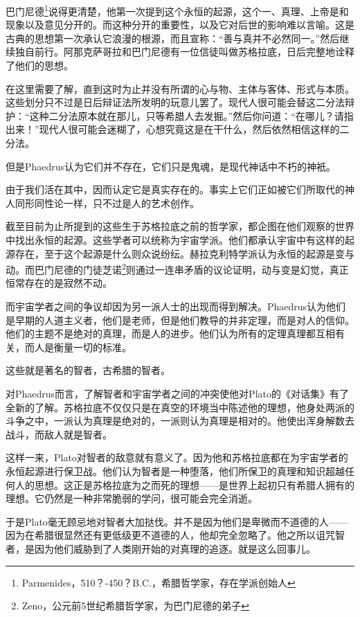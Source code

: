 \documentclass[UTF8]{article}
\begin{document}
\par 巴门尼德\footnote{Parmenides，510？-450？B.C.，希腊哲学家，存在学派创始人}说得更清楚，他第一次提到这个永恒的起源，这个一、真理、上帝是和现象以及意见分开的。而这种分开的重要性，以及它对后世的影响难以言喻。这是古典的思想第一次承认它浪漫的根源，而且宣称：“善与真并不必然同一。”然后继续独自前行。阿那克萨哥拉和巴门尼德有一位信徒叫做苏格拉底，日后完整地诠释了他们的思想。
\par 在这里需要了解，直到这时为止并没有所谓的心与物、主体与客体、形式与本质。这些划分只不过是日后辩证法所发明的玩意儿罢了。现代人很可能会替这二分法辩护：“这种二分法原本就在那儿，只等希腊人去发掘。”然后你问道：“在哪儿？请指出来！”现代人很可能会迷糊了，心想究竟这是在干什么，然后依然相信这样的二分法。
\par 但是Phaedrus认为它们并不存在，它们只是鬼魂，是现代神话中不朽的神衹。
\par 由于我们活在其中，因而认定它是真实存在的。事实上它们正如被它们所取代的神人同形同性论一样，只不过是人的艺术创作。
\par 截至目前为止所提到的这些生于苏格拉底之前的哲学家，都企图在他们观察的世界中找出永恒的起源。这些学者可以统称为宇宙学派。他们都承认宇宙中有这样的起源存在，至于这个起源是什么则众说纷纭。赫拉克利特学派认为永恒的起源是变与动。而巴门尼德的门徒芝诺\footnote{Zeno，公元前5世纪希腊哲学家，为巴门尼德的弟子}则通过一连串矛盾的议论证明，动与变是幻觉，真正恒常存在的是寂然不动。
\par 而宇宙学者之间的争议却因为另一派人士的出现而得到解决。Phaedrus认为他们是早期的人道主义者，他们是老师，但是他们教导的并非定理，而是对人的信仰。他们的主题不是绝对的真理，而是人的进步。他们认为所有的定理真理都互相有关，而人是衡量一切的标准。
\par 这些就是著名的智者，古希腊的智者。
\par 对Phaedrus而言，了解智者和宇宙学者之间的冲突使他对Plato的《对话集》有了全新的了解。苏格拉底不仅仅只是在真空的环境当中陈述他的理想，他身处两派的斗争之中，一派认为真理是绝对的，一派则认为真理是相对的。他使出浑身解数去战斗，而敌人就是智者。
\par 这样一来，Plato对智者的敌意就有意义了。因为他和苏格拉底都在为宇宙学者的永恒起源进行保卫战。他们认为智者是一种堕落，他们所保卫的真理和知识超越任何人的思想。这正是苏格拉底为之而死的理想——是世界上起初只有希腊人拥有的理想。它仍然是一种非常脆弱的学问，很可能会完全消逝。
\par 于是Plato毫无顾忌地对智者大加挞伐。并不是因为他们是卑微而不道德的人——因为在希腊很显然还有更低级更不道德的人，他却完全忽略了。他之所以诅咒智者，是因为他们威胁到了人类刚开始的对真理的追逐。就是这么回事儿。
\end{document}

